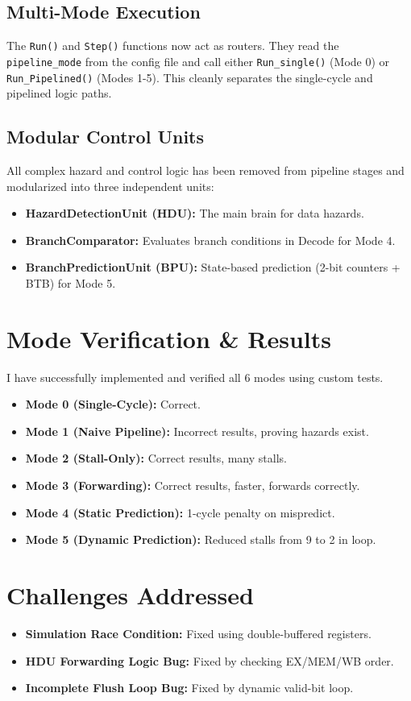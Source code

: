 \documentclass[11pt, a4paper]{article}
\begin{document}
\subsection{Multi-Mode Execution}
The \texttt{Run()} and \texttt{Step()} functions now act as routers. They read the \texttt{pipeline\_mode} from the config file and call either \texttt{Run\_single()} (Mode 0) or \texttt{Run\_Pipelined()} (Modes 1-5). This cleanly separates the single-cycle and pipelined logic paths.

\subsection{Modular Control Units}
All complex hazard and control logic has been removed from pipeline stages and modularized into three independent units:
\begin{itemize}[leftmargin=*]
    \item \textbf{HazardDetectionUnit (HDU):} The main brain for data hazards.
    \item \textbf{BranchComparator:} Evaluates branch conditions in Decode for Mode 4.
    \item \textbf{BranchPredictionUnit (BPU):} State-based prediction (2-bit counters + BTB) for Mode 5.
\end{itemize}

\section{Mode Verification \& Results}
I have successfully implemented and verified all 6 modes using custom tests.

\begin{itemize}[leftmargin=*]
    \item \textbf{Mode 0 (Single-Cycle):} Correct.
    \item \textbf{Mode 1 (Naive Pipeline):} Incorrect results, proving hazards exist.
    \item \textbf{Mode 2 (Stall-Only):} Correct results, many stalls.
    \item \textbf{Mode 3 (Forwarding):} Correct results, faster, forwards correctly.
    \item \textbf{Mode 4 (Static Prediction):} 1-cycle penalty on mispredict.
    \item \textbf{Mode 5 (Dynamic Prediction):} Reduced stalls from 9 to 2 in loop.
\end{itemize}

\section{Challenges Addressed}
\begin{itemize}[leftmargin=*]
    \item \textbf{Simulation Race Condition:} Fixed using double-buffered registers.
    \item \textbf{HDU Forwarding Logic Bug:} Fixed by checking EX/MEM/WB order.
    \item \textbf{Incomplete Flush Loop Bug:} Fixed by dynamic valid-bit loop.
\end{itemize}
\end{document}
